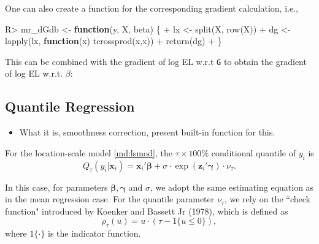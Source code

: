 \documentclass[article]{jss}
\newenvironment{Shaded}{\begin{snugshade}}{\end{snugshade}}
\newcommand{\ControlFlowTok}[1]{\textcolor[rgb]{0.13,0.29,0.53}{\textbf{#1}}}
\newcommand{\FunctionTok}[1]{\textcolor[rgb]{0.00,0.00,0.00}{#1}}
\newcommand{\NormalTok}[1]{#1}
\newcommand{\OtherTok}[1]{\textcolor[rgb]{0.56,0.35,0.01}{#1}}
\newcommand{\SpecialCharTok}[1]{\textcolor[rgb]{0.00,0.00,0.00}{#1}}
\providecommand{\tightlist}{%
  \setlength{\itemsep}{0pt}\setlength{\parskip}{0pt}}
\renewcommand{\|}{\,|\,}
\begin{document}
One can also create a function for the corresponding gradient calculation, i.e.,

\begin{Shaded}
\begin{Highlighting}[]
\NormalTok{R}\SpecialCharTok{\textgreater{}}\NormalTok{ mr\_dGdb }\OtherTok{\textless{}{-}} \ControlFlowTok{function}\NormalTok{(y, X, beta) \{}
\SpecialCharTok{+}\NormalTok{    lx }\OtherTok{\textless{}{-}} \FunctionTok{split}\NormalTok{(X, }\FunctionTok{row}\NormalTok{(X))}
\SpecialCharTok{+}\NormalTok{    dg }\OtherTok{\textless{}{-}} \FunctionTok{lapply}\NormalTok{(lx, }\ControlFlowTok{function}\NormalTok{(x) }\FunctionTok{tcrossprod}\NormalTok{(x,x))}
\SpecialCharTok{+}    \FunctionTok{return}\NormalTok{(dg)}
\SpecialCharTok{+}\NormalTok{  \}}
\end{Highlighting}
\end{Shaded}

This can be combined with the gradient of log EL w.r.t \texttt{G} to obtain the gradient of log EL w.r.t. \(\beta\):

\hypertarget{quantile-regression}{%
\subsection{Quantile Regression}\label{quantile-regression}}

\begin{itemize}
\tightlist
\item
  What it is, smoothness correction, present built-in function for this.
\end{itemize}

For the location-scale model \eqref{md:lsmod}, the \(\tau\times 100\%\) conditional quantile of \(y_i\) is
\begin{equation} \label{eq:lsqr}
  Q_{\tau}(y_i|\bm x_i) = \bm x_i' \bm \beta+ \sigma\cdot\exp(\bm z_i' \bm \gamma)\cdot\nu_{\tau}.
\end{equation}

In this case, for parameters \(\bm \beta,\bm \gamma\) and \(\sigma\), we adopt the same estimating equation as in the mean regression case. For the quantile parameter \(\nu_{\tau}\), we rely on the ``check function" introduced by Koenker and Bassett Jr (1978), which is defined as
\begin{equation}\label{eq:check}
\rho_\tau(u) = u\cdot(\tau - \mathfrak 1 \{u \le 0\}),
\end{equation}
where \(\mathfrak 1\{\cdot\}\) is the indicator function.
\end{document}
